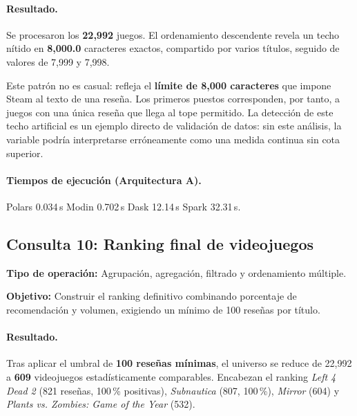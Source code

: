 
\paragraph{Resultado.}
Se procesaron los \textbf{22,992} juegos. El ordenamiento descendente revela un techo nítido en \textbf{8,000.0} caracteres exactos, compartido por varios títulos, seguido de valores de 7,999 y 7,998.

Este patrón no es casual: refleja el \textbf{límite de 8,000 caracteres} que impone Steam al texto de una reseña. Los primeros puestos corresponden, por tanto, a juegos con una única reseña que llega al tope permitido. La detección de este techo artificial es un ejemplo directo de validación de datos: sin este análisis, la variable podría interpretarse erróneamente como una medida continua sin cota superior.

\paragraph{Tiempos de ejecución (Arquitectura A).}
Polars 0.034\,s \textbar{} Modin 0.702\,s \textbar{} Dask 12.14\,s \textbar{} Spark 32.31\,s.



\subsection{Consulta 10: Ranking final de videojuegos}

\textbf{Tipo de operación:} Agrupación, agregación, filtrado y ordenamiento múltiple.

\textbf{Objetivo:} Construir el ranking definitivo combinando porcentaje de recomendación y volumen, exigiendo un mínimo de 100 reseñas por título.


\paragraph{Resultado.}
Tras aplicar el umbral de \textbf{100 reseñas mínimas}, el universo se reduce de 22,992 a \textbf{609} videojuegos estadísticamente comparables. Encabezan el ranking \textit{Left 4 Dead 2} (821 reseñas, 100\,\% positivas), \textit{Subnautica} (807, 100\,\%), \textit{Mirror} (604) y \textit{Plants vs. Zombies: Game of the Year} (532).

